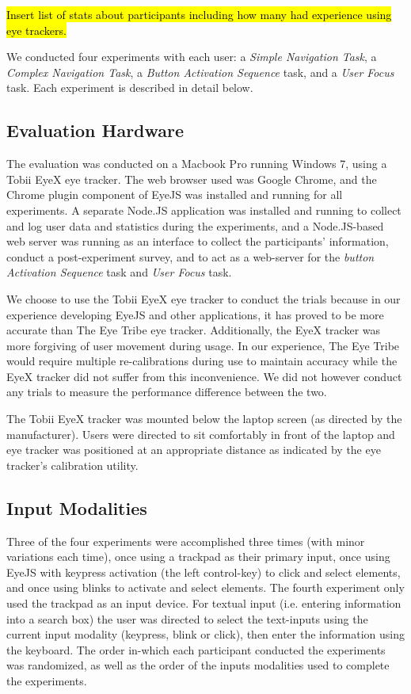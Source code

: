 \documentclass{sigchi}
\begin{document}
\hl{Insert list of stats about participants including how many had experience using eye trackers.}

We conducted four experiments with each user: a \emph{Simple Navigation Task}, a \emph{Complex Navigation Task}, a \emph{Button Activation Sequence} task, and a \emph{User Focus} task. Each experiment is described in detail below.

\subsection{Evaluation Hardware}
The evaluation was conducted on a Macbook Pro running Windows 7, using a Tobii EyeX eye tracker. The web browser used was Google Chrome, and the Chrome plugin component of EyeJS was installed and running for all experiments. A separate Node.JS application was installed and running to collect and log user data and statistics during the experiments, and a Node.JS-based web server was running as an interface to collect the participants' information, conduct a post-experiment survey, and to act as a web-server for the \emph{button Activation Sequence} task and \emph{User Focus} task.

We choose to use the Tobii EyeX eye tracker to conduct the trials because in our experience developing EyeJS and other applications, it has proved to be more accurate than The Eye Tribe eye tracker. Additionally, the EyeX tracker was more forgiving of user movement during usage. In our experience, The Eye Tribe would require multiple re-calibrations during use to maintain accuracy while the EyeX tracker did not suffer from this inconvenience. We did not however conduct any trials to measure the performance difference between the two. 

The Tobii EyeX tracker was mounted below the laptop screen (as directed by the manufacturer). Users were directed to sit comfortably in front of the laptop and eye tracker was positioned at an appropriate distance as indicated by the eye tracker's calibration utility. 


\subsection{Input Modalities}
Three of the four experiments were accomplished three times (with minor variations each time), once using a trackpad as their primary input, once using EyeJS with keypress activation (the left control-key) to click and select elements, and once using blinks to activate and select elements. The fourth experiment only used the trackpad as an input device. For textual input (i.e. entering information into a search box) the user was directed to select the text-inputs using the current input modality (keypress, blink or click), then enter the information using the keyboard. The order in-which each participant conducted the experiments was randomized, as well as the order of the inputs modalities used to complete the experiments. 
\end{document}
